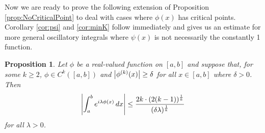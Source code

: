 \documentclass[11pt, letter]{book}
\newtheorem{proposition}[theorem]{Proposition}
\newcommand{\f}[2]{\frac{#1}{#2}}
\begin{document}
\noindent Now we are ready to prove the following extension of Proposition \ref{prop:NoCriticalPoint} to deal with cases where $\phi(x)$ has critical points. Corollary \ref{cor:psi} and \ref{cor:minK} follow immediately and gives us an estimate for more general oscillatory integrals where $\psi(x)$ is not necessarily the constantly 1 function. 
\begin{framed}
\begin{proposition}\label{prop:NoPsi}
Let $\phi$ be a real-valued function on $[a,b]$ and suppose that, for some $k\geq 2$, $\phi\in C^k([a,b])$ and $\abs{\phi^{(k)}(x)} \geq \delta$ for all $x\in [a,b]$ where $\delta>0$. Then
\begin{equation*}
    \abs{\int_a^b e^{i\lambda \phi(x)} \,dx} \leq \f{2k\cdot (2(k-1))^{\f{1}{k}}}{(\delta\lambda)^{\f{1}{k}}}
\end{equation*}
for all $\lambda>0$.
\end{proposition}
\end{framed}
\end{document}
